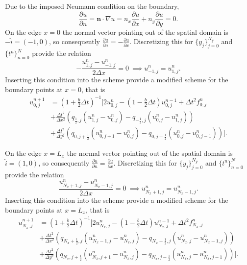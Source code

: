 \documentclass[11pt]{article}
\begin{document}
Due to the imposed Neumann condition on the boundary,
\begin{equation*}
\frac{\partial u}{\partial n} = \mathbf{n} \cdot \nabla u = n_x\frac{\partial u}{\partial x} + n_y \frac{\partial u}{\partial y} = 0. 
\end{equation*}
On the edge $x=0$ the normal vector pointing out of the spatial domain is $-\hat{i} = (-1,0)$, so consequently $\frac{\partial u}{\partial n} = -\frac{\partial u}{\partial x}$.
Discretizing this for $\{y_j\}_{j=0}^{N_y}$ and $\{t^n\}_{n=0}^N$ provide the relation
\begin{equation*}
-\frac{u_{1,j}^n - u_{-1,j}^n}{2\Delta x} = 0 \ \implies u_{-1,j}^n = u_{1,j}^n.
\end{equation*}
Inserting this condition into the scheme provide a modified scheme for the boundary points at $x=0$, that is
\begin{align}
u_{0,j}^{n+1} &= (1+\frac{b}{2}\Delta t)^{-1} \bigg[2u_{0,j}^n - (1-\frac{b}{2}\Delta t) u_{0,j}^{n-1} + \Delta t^2 f_{0,j}^n \nonumber \\
&+ \frac{\Delta t^2}{\Delta x^2} \left(q_{\frac{1}{2},j} (u_{1,j}^n - u_{0,j}^n) -  q_{-\frac{1}{2},j} (u_{0,j}^n - u_{1,j}^n) \right) \\
&+ \frac{\Delta t^2}{\Delta y^2} \left(q_{0,j+\frac{1}{2}} (u_{0,j+1}^n - u_{0,j}^n) -  q_{0,j-\frac{1}{2}} (u_{0,j}^n - u_{0,j-1}^n) \right) \bigg]. \nonumber
\end{align}

On the edge $x=L_x$ the normal vector pointing out of the spatial domain is $\hat{i} = (1,0)$, so consequently $\frac{\partial u}{\partial n} = \frac{\partial u}{\partial x}$.
Discretizing this for $\{y_j\}_{j=0}^{N_y}$ and $\{t^n\}_{n=0}^N$ provide the relation
\begin{equation*}
\frac{u_{N_x + 1,j}^n - u_{N_x - 1,j}^n}{2\Delta x} = 0 \ \implies u_{N_x + 1,j}^n = u_{N_x - 1,j}^n.
\end{equation*}
Inserting this condition into the scheme provide a modified scheme for the boundary points at $x=L_x$, that is
\begin{align}
u_{N_x,j}^{n+1} &= (1+\frac{b}{2}\Delta t)^{-1} \bigg[2u_{N_x,j}^n - (1-\frac{b}{2}\Delta t) u_{N_x,j}^{n-1} + \Delta t^2 f_{N_x,j}^n \nonumber \\
&+ \frac{\Delta t^2}{\Delta x^2} \left(q_{N_x+\frac{1}{2},j} (u_{N_x-1,j}^n - u_{N_x,j}^n) -  q_{N_x-\frac{1}{2},j} (u_{N_x,j}^n - u_{N_x-1,j}^n) \right) \\
&+ \frac{\Delta t^2}{\Delta y^2} \left(q_{N_x,j+\frac{1}{2}} (u_{N_x,j+1}^n - u_{N_x,j}^n) -  q_{N_x,j-\frac{1}{2}} (u_{N_x,j}^n - u_{N_x,j-1}^n) \right) \bigg]. \nonumber
\end{align}
\end{document}
